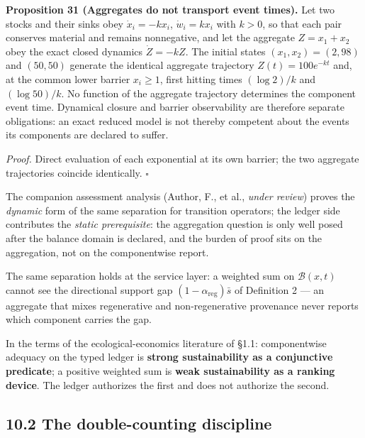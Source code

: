 \documentclass[11pt]{article}
\begin{document}
\textbf{Proposition 31 (Aggregates do not transport event times).} Let two stocks and their sinks obey \(\dot x_i=-kx_i\), \(\dot w_i=kx_i\) with \(k>0\), so that each pair conserves material and remains nonnegative, and let the aggregate \(Z=x_1+x_2\) obey the exact closed dynamics \(\dot Z=-kZ\). The initial states \((x_1,x_2)=(2,98)\) and \((50,50)\) generate the identical aggregate trajectory \(Z(t)=100e^{-kt}\) and, at the common lower barrier \(x_i\ge1\), first hitting times \((\log2)/k\) and \((\log50)/k\). No function of the aggregate trajectory determines the component event time. Dynamical closure and barrier observability are therefore separate obligations: an exact reduced model is not thereby competent about the events its components are declared to suffer.

\emph{Proof.} Direct evaluation of each exponential at its own barrier; the two aggregate trajectories coincide identically. \(\square\)

The companion assessment analysis (Author, F., et al., \emph{under review}) proves the \emph{dynamic} form of the same separation for transition operators; the ledger side contributes the \emph{static prerequisite}: the aggregation question is only well posed after the balance domain is declared, and the burden of proof sits on the aggregation, not on the componentwise report.

The same separation holds at the service layer: a weighted sum on \(\mathcal B(x,t)\) cannot see the directional support gap \((1-\alpha_{\mathrm{reg}})\bar s\) of Definition 2 --- an aggregate that mixes regenerative and non-regenerative provenance never reports which component carries the gap.

In the terms of the ecological-economics literature of \S1.1: componentwise adequacy on the typed ledger is \textbf{strong sustainability as a conjunctive predicate}; a positive weighted sum is \textbf{weak sustainability as a ranking device}. The ledger authorizes the first and does not authorize the second.

\subsection*{10.2 The double-counting discipline}\label{102-the-double-counting-discipline}
\end{document}
